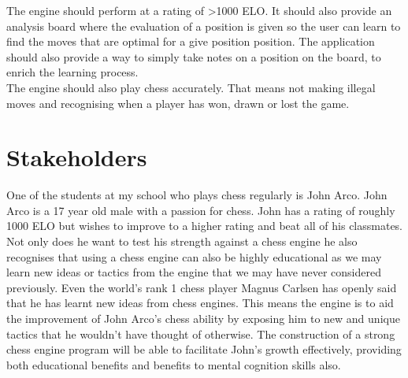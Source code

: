 The engine should perform at a rating of >1000 ELO. It 
should also provide an analysis board where the evaluation
of a position is given so the user can learn to find the moves
that are optimal for a give position position. The application should
also provide a way to simply take notes on a position on the
board, to enrich the learning process.\\


The engine should also play chess accurately. That means
not making illegal moves and recognising when a player has
won, drawn or lost the game.

  

\newpage
\section{Stakeholders}
One of the students at my school who plays chess regularly is 
John Arco. John Arco is a 17 year old male with a passion for chess.
John has a rating of roughly 1000 ELO but wishes 
to improve to a higher rating and beat all of his 
classmates. Not only does he want to test his strength against a 
chess engine he also recognises that using a chess engine can also be highly 
educational as we may learn new ideas or tactics from the engine that
we may have never considered previously. Even the world's rank 1 chess
player Magnus Carlsen has openly said that he has learnt new ideas
from chess engines. \cite{lex} This means the engine is to aid
the improvement of John Arco's chess ability by exposing him to 
new and unique tactics that he wouldn't have thought of otherwise. 
The construction of a strong chess engine program will be able to
facilitate John's growth effectively, providing both educational benefits and 
benefits to mental cognition skills also. \cite{cog} 

